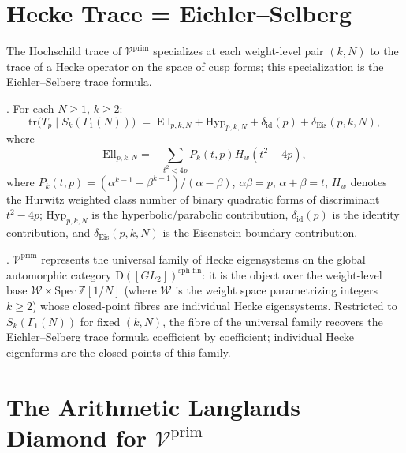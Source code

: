 \section{Hecke Trace = Eichler--Selberg}
\label{v4-arith:bb:hecke-trace}

The Hochschild trace of \(\mathcal{V}^{\mathrm{prim}}\) specializes at
each weight-level pair \((k,N)\) to the trace of a Hecke operator on
the space of cusp forms; this specialization is the Eichler--Selberg
trace formula.

\begin{theorem}
\label{v4-arith:thm:corrected-hecke-trace}
\ClaimStatusProvedElsewhere. For each \(N\geq 1\), \(k\geq 2\):
\begin{equation}
\mathrm{tr}\bigl(T_{p}\mid S_{k}(\Gamma_{1}(N))\bigr)\;=\;
\mathrm{Ell}_{p,k,N}+\mathrm{Hyp}_{p,k,N}
+\delta_{\mathrm{id}}(p)+\delta_{\mathrm{Eis}}(p,k,N),
\end{equation}
where
\[
\mathrm{Ell}_{p,k,N}=-\sum_{t^{2}<4p}P_{k}(t,p)H_{w}(t^{2}-4p),
\]
where \(P_{k}(t,p)=(\alpha^{k-1}-\beta^{k-1})/(\alpha-\beta)\),
\(\alpha\beta=p\), \(\alpha+\beta=t\), \(H_{w}\) denotes the Hurwitz
weighted class number of binary quadratic forms of discriminant \(t^2-4p\);
\(\mathrm{Hyp}_{p,k,N}\) is the hyperbolic/parabolic contribution,
\(\delta_{\mathrm{id}}(p)\) is the identity contribution, and
\(\delta_{\mathrm{Eis}}(p,k,N)\) is the Eisenstein boundary
contribution.
\end{theorem}

\begin{theorem}
\label{v4-arith:thm:trace-class-tabulation}
\ClaimStatusConjectured. \(\mathcal{V}^{\mathrm{prim}}\) represents
the universal family of Hecke eigensystems on the global automorphic
category \(\mathrm{D}([GL_{2}])^{\mathrm{sph\text{-}fin}}\): it is
the object over the weight-level base \(\mathcal{W}\times\mathrm{Spec}\,\mathbb{Z}[1/N]\)
(where \(\mathcal{W}\) is the weight space parametrizing integers \(k\geq 2\))
whose closed-point fibres are individual Hecke eigensystems.
Restricted to \(S_{k}(\Gamma_{1}(N))\) for fixed \((k,N)\), the fibre of the
universal family recovers the Eichler--Selberg trace formula
coefficient by coefficient; individual Hecke eigenforms are
the closed points of this family.
\end{theorem}

\section{The Arithmetic Langlands Diamond for \(\mathcal{V}^{\mathrm{prim}}\)}
\label{v4-arith:bb:summary}

